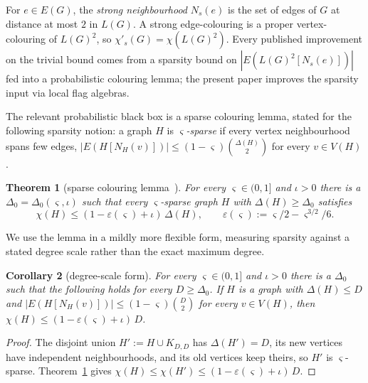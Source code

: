 \documentclass[11pt,a4paper]{article}
\newtheorem{theorem}{Theorem}[section]
\newtheorem{corollary}[theorem]{Corollary}
\theoremstyle{definition}
\theoremstyle{remark}
\begin{document}
For $e \in E(G)$, the \emph{strong neighbourhood} $N_s(e)$ is the
set of edges of $G$ at distance at most $2$ in $L(G)$. A strong
edge-colouring is a proper vertex-colouring of $L(G)^2$, so
$\chi'_s(G) = \chi(L(G)^2)$. Every published improvement on the
trivial bound comes from a sparsity bound on
$|E(L(G)^2[N_s(e)])|$ fed into a probabilistic colouring lemma;
the present paper improves the sparsity input via local flag
algebras.

The relevant probabilistic black box is a sparse colouring lemma,
stated for the following sparsity notion: a graph $H$ is
\emph{$\varsigma$-sparse} if every vertex neighbourhood spans few
edges, $|E(H[N_H(v)])| \leq (1 - \varsigma)\binom{\Delta(H)}{2}$ for
every $v \in V(H)$.

\begin{theorem}[sparse colouring lemma~{\cite{hurleyImprovedProcedureColouring2022}}]
\label{thm:hjk-colouring}
For every $\varsigma \in (0, 1]$ and $\iota > 0$ there is a
$\Delta_0 = \Delta_0(\varsigma, \iota)$ such that every
$\varsigma$-sparse graph $H$ with $\Delta(H) \geq \Delta_0$ satisfies
\[
\chi(H) \leq (1 - \varepsilon(\varsigma) + \iota)\,\Delta(H),
\qquad
\varepsilon(\varsigma) := \varsigma/2 - \varsigma^{3/2}/6.
\]
\end{theorem}

We use the lemma in a mildly more flexible form, measuring sparsity
against a stated degree scale rather than the exact maximum degree.

\begin{corollary}[degree-scale form]
\label{cor:hjk-scale}
For every $\varsigma \in (0, 1]$ and $\iota > 0$ there is a
$\Delta_0$ such that the following holds for every $D \geq \Delta_0$.
If $H$ is a graph with $\Delta(H) \leq D$ and
$|E(H[N_H(v)])| \leq (1 - \varsigma)\binom{D}{2}$ for every
$v \in V(H)$, then $\chi(H) \leq (1 - \varepsilon(\varsigma) + \iota)\,D$.
\end{corollary}

\begin{proof}
The disjoint union $H' := H \cup K_{D,D}$ has $\Delta(H') = D$, its
new vertices have independent neighbourhoods, and its old vertices
keep theirs, so $H'$ is $\varsigma$-sparse.
Theorem~\ref{thm:hjk-colouring} gives
$\chi(H) \leq \chi(H') \leq (1 - \varepsilon(\varsigma) + \iota)\,D$.
\end{proof}
\end{document}
